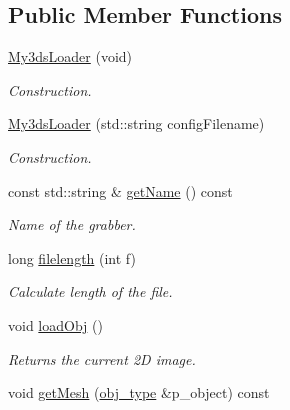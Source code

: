 \subsection*{Public Member Functions}
\begin{DoxyCompactItemize}
\item 
\hyperlink{classMy3dsLoader_a2ec15764e6501b488b47ebf85f7dfb84}{My3ds\+Loader} (void)\hypertarget{classMy3dsLoader_a2ec15764e6501b488b47ebf85f7dfb84}{}\label{classMy3dsLoader_a2ec15764e6501b488b47ebf85f7dfb84}

\begin{DoxyCompactList}\small\item\em Construction. \end{DoxyCompactList}\item 
\hyperlink{classMy3dsLoader_aa4ea934dd34962146a209cb5036e0b64}{My3ds\+Loader} (std\+::string config\+Filename)\hypertarget{classMy3dsLoader_aa4ea934dd34962146a209cb5036e0b64}{}\label{classMy3dsLoader_aa4ea934dd34962146a209cb5036e0b64}

\begin{DoxyCompactList}\small\item\em Construction. \end{DoxyCompactList}\item 
const std\+::string \& \hyperlink{classMy3dsLoader_ac42bea72ba58d139c98dd1a61267f8f8}{get\+Name} () const \hypertarget{classMy3dsLoader_ac42bea72ba58d139c98dd1a61267f8f8}{}\label{classMy3dsLoader_ac42bea72ba58d139c98dd1a61267f8f8}

\begin{DoxyCompactList}\small\item\em Name of the grabber. \end{DoxyCompactList}\item 
long \hyperlink{classMy3dsLoader_a1dc2902c070dc92b5960124cdaf11c0d}{filelength} (int f)\hypertarget{classMy3dsLoader_a1dc2902c070dc92b5960124cdaf11c0d}{}\label{classMy3dsLoader_a1dc2902c070dc92b5960124cdaf11c0d}

\begin{DoxyCompactList}\small\item\em Calculate length of the file. \end{DoxyCompactList}\item 
void \hyperlink{classMy3dsLoader_aff153c852f8e537b7ddfd961ea1231f8}{load\+Obj} ()\hypertarget{classMy3dsLoader_aff153c852f8e537b7ddfd961ea1231f8}{}\label{classMy3dsLoader_aff153c852f8e537b7ddfd961ea1231f8}

\begin{DoxyCompactList}\small\item\em Returns the current 2D image. \end{DoxyCompactList}\item 
void \hyperlink{classMy3dsLoader_a90c273b63662560b3b873794a0f54d4d}{get\+Mesh} (\hyperlink{structputar_1_1obj__type}{obj\+\_\+type} \&p\+\_\+object) const \hypertarget{classMy3dsLoader_a90c273b63662560b3b873794a0f54d4d}{}\label{classMy3dsLoader_a90c273b63662560b3b873794a0f54d4d}


\end{DoxyCompactItemize}

